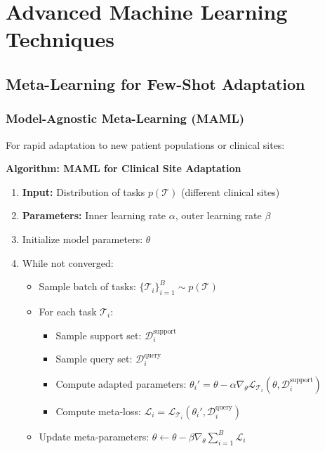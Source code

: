 \documentclass[11pt]{article}
\begin{document}
\section{Advanced Machine Learning Techniques}
\label{sec:advanced_ml}

\subsection{Meta-Learning for Few-Shot Adaptation}

\subsubsection{Model-Agnostic Meta-Learning (MAML)}
For rapid adaptation to new patient populations or clinical sites:

\textbf{Algorithm: MAML for Clinical Site Adaptation}

\begin{enumerate}
\item \textbf{Input:} Distribution of tasks $p(\mathcal{T})$ (different clinical sites)
\item \textbf{Parameters:} Inner learning rate $\alpha$, outer learning rate $\beta$
\item Initialize model parameters: $\theta$
\item While not converged:
    \begin{itemize}
    \item Sample batch of tasks: $\{\mathcal{T}_i\}_{i=1}^B \sim p(\mathcal{T})$
    \item For each task $\mathcal{T}_i$:
        \begin{itemize}
        \item Sample support set: $\mathcal{D}_i^{\text{support}}$
        \item Sample query set: $\mathcal{D}_i^{\text{query}}$
        \item Compute adapted parameters: $\theta_i' = \theta - \alpha \nabla_\theta \mathcal{L}_{\mathcal{T}_i}(\theta, \mathcal{D}_i^{\text{support}})$
        \item Compute meta-loss: $\mathcal{L}_i = \mathcal{L}_{\mathcal{T}_i}(\theta_i', \mathcal{D}_i^{\text{query}})$
        \end{itemize}
    \item Update meta-parameters: $\theta \leftarrow \theta - \beta \nabla_\theta \sum_{i=1}^B \mathcal{L}_i$
    \end{itemize}
\end{enumerate}
\end{document}

